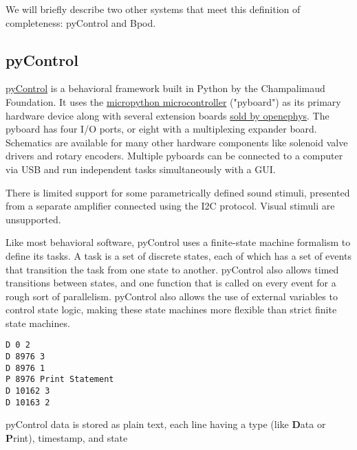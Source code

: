 We will briefly describe two other systems that meet this definition of completeness: pyControl and Bpod.

\subsection{pyControl}

\href{https://pycontrol.readthedocs.io/en/latest/}{pyControl}\citep{akamOpensourcePythonbasedHardware2022} is a behavioral framework built in Python by the Champalimaud Foundation. It uses the \href{https://micropython.org/}{micropython microcontroller} ("pyboard") as its primary hardware device along with several extension boards \href{http://www.open-ephys.org/store/pycontrol}{sold by openephys}. The pyboard has four I/O ports, or eight with a multiplexing expander board. Schematics are available for many other hardware components like solenoid valve drivers and rotary encoders. Multiple pyboards can be connected to a computer via USB and run independent tasks simultaneously with a GUI.

There is limited support for some parametrically defined sound stimuli, presented from a separate amplifier connected using the I2C protocol. Visual stimuli are unsupported.

Like most behavioral software, pyControl uses a finite-state machine formalism to define its tasks. A task is a set of discrete states, each of which has a set of events that transition the task from one state to another. pyControl also allows timed transitions between states, and one function that is called on every event for a rough sort of parallelism. pyControl also allows the use of external variables to control state logic, making these state machines more flexible than strict finite state machines.

\begin{marginfigure}[-3.5cm]
\begin{verbatim}
D 0 2
D 8976 3
D 8976 1
P 8976 Print Statement
D 10162 3
D 10163 2
\end{verbatim}
\caption{pyControl data is stored as plain text, each line having a type (like \textbf{D}ata or \textbf{P}rint), timestamp, and state}
\label{fig:pycdata}
\end{marginfigure}


